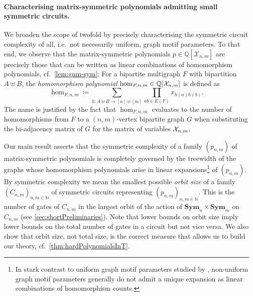 \documentclass[11pt, DIV=15]{scrarticle}
\theoremstyle{definition}
\theoremstyle{plain}
\theoremstyle{remark}
\newcommand{\Xx}{{\cal X}}
\newcommand{\Sym}{\mathbf{Sym}}
\newcommand{\bbN}{\mathbb{N}}
\newcommand{\bbQ}{\mathbb{Q}}
\begin{document}
\paragraph{Characterising matrix-symmetric polynomials admitting small symmetric circuits.}
We broaden the scope of \cite{curticapean_homomorphisms_2017} twofold by precisely characterising the symmetric circuit complexity of all, i.e.\ not necessarily uniform, graph motif parameters.
To that end, we observe that the matrix-symmetric polynomials $p \in \mathbb{Q}[\mathcal{X}_{n,m}]$ are precisely those that can be written as linear combinations of homomorphism polynomials, cf.\ \cref{lem:gnm-sym}:
For a bipartite multigraph   $F$  with bipartition $A \uplus B$, the \emph{homomorphism polynomial} $\hom_{F,n,m} \in \bbQ[\Xx_{n,m}]$ is defined as
\[
\hom_{F,n,m} \coloneqq \sum_{h \colon A \uplus B \to [n] \uplus [m]} \prod_{ab \in E(F)} x_{h(a)h(b)}.
\]
The name is justified by the fact that $\hom_{F,n,m}$ evaluates to the number of homomorphisms from $F$ to a $(n,m)$-vertex bipartite graph $G$ when substituting the bi-adjacency matrix  of $G$ for the matrix of variables $\Xx_{n,m}$.


Our main result asserts that the symmetric complexity of a family $(p_{n,m})$ of matrix-symmetric polynomials is completely governed by the treewidth of the graphs whose homomorphism polynomials arise in linear expansions\footnote{In stark contrast to uniform graph motif parameters studied by \textcite{curticapean_homomorphisms_2017}, non-uniform graph motif parameters generally do not admit a unique expansion as linear combinations of homomorphism counts.} of $(p_{n,m})$.
By symmetric complexity we mean the smallest possible \emph{orbit size} of a family $(C_{n,m})_{n,m \in \bbN}$ of symmetric circuits representing $(p_{n,m})_{n,m \in \bbN}$. This is the number of gates of $C_{n,m}$ in
the largest orbit of the action of $\Sym_n \times \Sym_m$ on $C_{n,m}$ (see \cref{sec:shortPreliminaries}). 
Note that lower bounds on orbit size imply lower bounds on the total number of gates in a circuit but not vice versa. 
We also show that orbit size, not total size, is the correct measure that allows us to build our theory, cf.\ \cref{thm:hardPolynomialsInT}.
\end{document}
